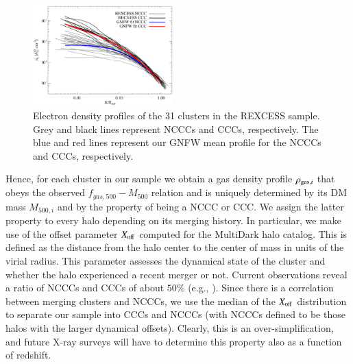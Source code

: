 \documentclass[useAMS,usenatbib]{mn2e}
\begin{document}
\begin{figure} 
\centering
\includegraphics[width=0.48\textwidth]{figures/gas_profiles.eps}
\caption{Electron density profiles of the 31 clusters in the REXCESS sample. Grey and black lines represent 
NCCCs and CCCs, respectively. The blue and red lines represent our GNFW mean profile for the NCCCs and CCCs, respectively.}
\label{fig:gas_profiles}
\end{figure}

Hence, for each cluster in our sample we obtain a gas density profile
$\rho_{{\mathrm{gas}},i}$ that obeys the observed $f_{gas,500}-M_{500}$ relation and
is uniquely determined by its DM mass $M_{500,i}$ and by the property of being a
NCCC or CCC. We assign the latter property to every halo depending on its
merging history. In particular, we make use of the offset parameter
$X_{{\mathrm{off}}}$ computed for the MultiDark halo catalog. This is defined as the
distance from the halo center to the center of mass in units of the virial
radius. This parameter assesses the dynamical state of the cluster and whether
the halo experienced a recent merger or not. Current observations reveal a ratio
of NCCCs and CCCs of about $50\%$ (e.g., \citealp{2007A&A...466..805C,
  2009MNRAS.395..764S}). Since there is a correlation between merging clusters
and NCCCs, we use the median of the $X_{{\mathrm{off}}}$ distribution to separate our
sample into CCCs and NCCCs (with NCCCs defined to be those halos with the larger
dynamical offsets). Clearly, this is an over-simplification, and future X-ray
surveys will have to determine this property also as a function of redshift.
\end{document}
